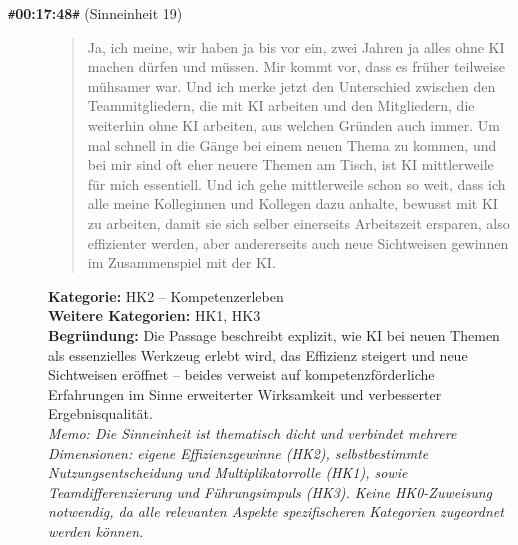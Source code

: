 \begin{description}
  \item[\texttt{\#}\textbf{00:17:48}\texttt{\#} (Sinneinheit 19)]
  \begin{quote}
  Ja, ich meine, wir haben ja bis vor ein, zwei Jahren ja alles ohne KI machen dürfen und müssen. Mir kommt vor, dass es früher teilweise mühsamer war. Und ich merke jetzt den Unterschied zwischen den Teammitgliedern, die mit KI arbeiten und den Mitgliedern, die weiterhin ohne KI arbeiten, aus welchen Gründen auch immer. Um mal schnell in die Gänge bei einem neuen Thema zu kommen, und bei mir sind oft eher neuere Themen am Tisch, ist KI mittlerweile für mich essentiell. Und ich gehe mittlerweile schon so weit, dass ich alle meine Kolleginnen und Kollegen dazu anhalte, bewusst mit KI zu arbeiten, damit sie sich selber einerseits Arbeitszeit ersparen, also effizienter werden, aber andererseits auch neue Sichtweisen gewinnen im Zusammenspiel mit der KI.
  \end{quote}
  \textbf{Kategorie:} HK2 -- Kompetenzerleben\\
  \textbf{Weitere Kategorien:} HK1, HK3\\
  \textbf{Begr\"undung:} Die Passage beschreibt explizit, wie KI bei neuen Themen als essenzielles Werkzeug erlebt wird, das Effizienz steigert und neue Sichtweisen eröffnet – beides verweist auf kompetenzförderliche Erfahrungen im Sinne erweiterter Wirksamkeit und verbesserter Ergebnisqualität.
  \\\textit{Memo: Die Sinneinheit ist thematisch dicht und verbindet mehrere Dimensionen: eigene Effizienzgewinne (HK2), selbstbestimmte Nutzungsentscheidung und Multiplikatorrolle (HK1), sowie Teamdifferenzierung und Führungsimpuls (HK3). Keine HK0-Zuweisung notwendig, da alle relevanten Aspekte spezifischeren Kategorien zugeordnet werden können.}
\end{description}
\medskip

